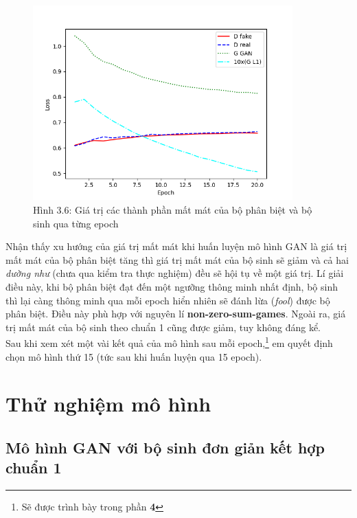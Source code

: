 \documentclass[a4paper]{article}
\begin{document}
\begin{figure}[h!]
\centering
\includegraphics[width=10cm]{images/3_6.png}
\caption{Hình 3.6: Giá trị các thành phần mất mát của bộ phân biệt và bộ sinh qua từng epoch}
\end{figure}

\noindent
Nhận thấy xu hướng của giá trị mất mát khi huấn luyện mô hình GAN là giá trị mất mát của bộ phân biệt tăng thì giá trị mất mát của bộ sinh sẽ giảm và cả hai \textit{dường như} (chưa qua kiểm tra thực nghiệm) đều sẽ hội tụ về một giá trị. Lí giải điều này, khi bộ phân biệt đạt đến một ngưỡng thông minh nhất định, bộ sinh thì lại càng thông minh qua mỗi epoch hiển nhiên sẽ đánh lừa (\textit{fool}) được bộ phân biệt. Điều này phù hợp với nguyên lí \textbf{non-zero-sum-games}. Ngoài ra, giá trị mất mát của bộ sinh theo chuẩn 1 cũng được giảm, tuy không đáng kể.\\

\noindent
Sau khi xem xét một vài kết quả của mô hình sau mỗi epoch,\footnote{Sẽ được trình bày trong phần \textbf{4 }} em quyết định chọn mô hình thứ 15 (tức sau khi huấn luyện qua 15 epoch).

\section{Thử nghiệm mô hình}\label{testmodel}\label{experiment}

\subsection{Mô hình GAN với bộ sinh đơn giản kết hợp chuẩn 1}
\end{document}
